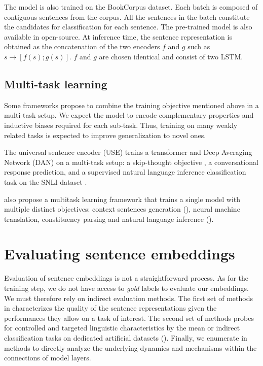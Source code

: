 
The model is also trained on the BookCorpus dataset. Each batch is composed of contiguous sentences from the corpus. All the sentences in the batch constitute the candidates for classification for each sentence. The pre-trained model is also available in open-source. At inference time, the sentence representation is obtained as the concatenation of the two encoders $f$ and $g$ such as $s \rightarrow [f(s);g(s)]$. $f$ and $g$ are chosen identical and consist of two LSTM. 


\subsection{Multi-task learning}

Some frameworks propose to combine the training objective mentioned above in a multi-task setup. We expect the model to encode complementary properties and inductive biases required for each sub-task. Thus, training on many weakly related tasks is expected to improve generalization to novel ones.

The universal sentence encoder (USE) \parencite{cer_18} trains a transformer and Deep Averaging Network (DAN) on a multi-task setup: a skip-thought objective \parencite{kiros_15}, a conversational response prediction, and a supervised natural language inference classification task on the SNLI dataset \parencite{bowman_15, conneau_17}.

\textcite{subramanian_18} also propose a multitask learning framework that trains a single model with multiple distinct objectives: context sentences generation (), neural machine translation, constituency parsing and natural language inference ().

\section{Evaluating sentence embeddings}

Evaluation of sentence embeddings is not a straightforward process. As for the training step, we do not have access to \textit{gold} labels to evaluate our embeddings. We must therefore rely on indirect evaluation methods. The first set of methods in  characterizes the quality of the sentence representations given the performances they allow on a task of interest. The second set of methods probes for controlled and targeted linguistic characteristics by the mean or indirect classification tasks on dedicated artificial datasets (). Finally, we enumerate in  methods to directly analyze the underlying dynamics and mechanisms within the connections of model layers.

